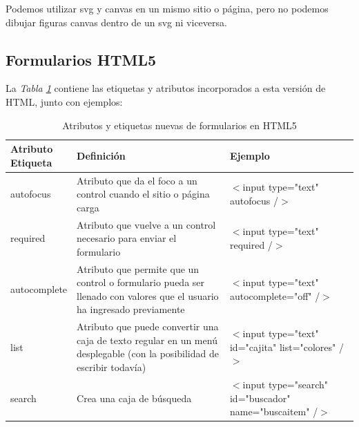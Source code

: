 Podemos utilizar svg y canvas en un mismo sitio o página, pero no podemos dibujar figuras canvas dentro de un svg ni viceversa.


\subsection{Formularios HTML5}

La \textit{Tabla \ref{tab: 2}} contiene las etiquetas y atributos incorporados a esta versión de HTML, junto con ejemplos:
\begin{table}[H]
    \begin{center}
        \caption{Atributos y etiquetas nuevas de formularios en HTML5}
        \label{tab: 2}
        \begin{tabular}{m{2.5cm} m{7cm} m{5cm}}
            \hline
            \parbox{2.5cm}{\textbf{Atributo \\ Etiqueta}} & \textbf{Definición} & \textbf{Ejemplo} \\
            \hline
            autofocus       & Atributo que da el foco a un control cuando el sitio o página carga                                                           & \parbox{5cm}{$<$input type="text" \\ autofocus /$>$} \\
            required        & Atributo que vuelve a un control necesario para enviar el formulario                                                          & \parbox{5cm}{$<$input type="text" \\ required /$>$} \\
            autocomplete    & Atributo que permite que un control o formulario pueda ser llenado con valores que el usuario ha ingresado previamente        & \parbox{5cm}{$<$input type="text" \\ autocomplete="off" /$>$} \\
            list            & Atributo que puede convertir una caja de texto regular en un menú desplegable (con la posibilidad de escribir todavía)        & \parbox{5cm}{$<$input type="text" \\ id="cajita" \\ list="colores" /$>$} \\
            search          & Crea una caja de búsqueda                                                                                       & \parbox{5cm}{$<$input type="search" \\ id="buscador" \\ name="buscaitem" /$>$} \\

\end{tabular}
\end{center}
\end{table}
